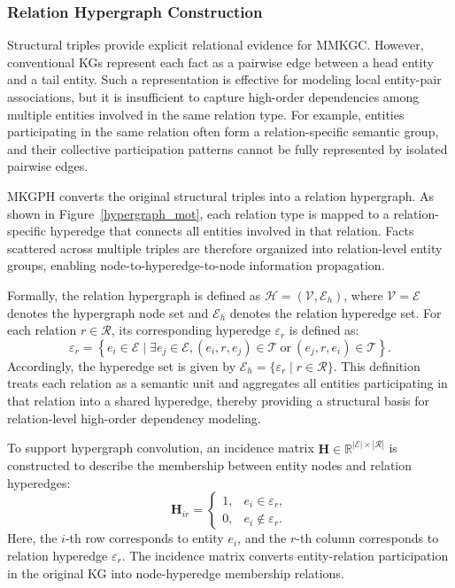 \documentclass[pdflatex,sn-mathphys-num]{sn-jnl}
\begin{document}
\subsubsection{Relation Hypergraph Construction}

Structural triples provide explicit relational evidence for MMKGC. However, conventional KGs represent each fact as a pairwise edge between a head entity and a tail entity. Such a representation is effective for modeling local entity-pair associations, but it is insufficient to capture high-order dependencies among multiple entities involved in the same relation type. For example, entities participating in the same relation often form a relation-specific semantic group, and their collective participation patterns cannot be fully represented by isolated pairwise edges.

MKGPH converts the original structural triples into a relation hypergraph. As shown in Figure~\ref{hypergraph_mot}, each relation type is mapped to a relation-specific hyperedge that connects all entities involved in that relation. Facts scattered across multiple triples are therefore organized into relation-level entity groups, enabling node-to-hyperedge-to-node information propagation.

Formally, the relation hypergraph is defined as $\mathcal{H}=(\mathcal{V},\mathcal{E}_{h})$, where $\mathcal{V}=\mathcal{E}$ denotes the hypergraph node set and $\mathcal{E}_{h}$ denotes the relation hyperedge set. For each relation $r\in\mathcal{R}$, its corresponding hyperedge $\varepsilon_r$ is defined as:
\begin{equation}
\varepsilon_r
=
\left\{
e_i\in\mathcal{E}
\mid
\exists e_j\in\mathcal{E},
(e_i,r,e_j)\in\mathcal{T}
\ \mathrm{or}\
(e_j,r,e_i)\in\mathcal{T}
\right\}.
\end{equation}
Accordingly, the hyperedge set is given by $\mathcal{E}_{h}=\{\varepsilon_r\mid r\in\mathcal{R}\}$. This definition treats each relation as a semantic unit and aggregates all entities participating in that relation into a shared hyperedge, thereby providing a structural basis for relation-level high-order dependency modeling.

To support hypergraph convolution, an incidence matrix $\mathbf{H}\in\mathbb{R}^{|\mathcal{E}|\times|\mathcal{R}|}$ is constructed to describe the membership between entity nodes and relation hyperedges:
\begin{equation}
\mathbf{H}_{ir}
=
\begin{cases}
1, & e_i\in\varepsilon_r, \\
0, & e_i\notin\varepsilon_r.
\end{cases}
\end{equation}
Here, the $i$-th row corresponds to entity $e_i$, and the $r$-th column corresponds to relation hyperedge $\varepsilon_r$. The incidence matrix converts entity-relation participation in the original KG into node-hyperedge membership relations.
\end{document}
